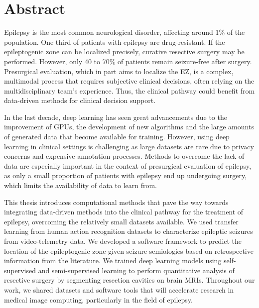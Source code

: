 \chapter{Abstract}


Epilepsy is the most common neurological disorder, affecting around 1\% of the population.
One third of patients with epilepsy are drug-resistant.
If the epileptogenic zone can be localized precisely, curative resective surgery may be performed.
However, only 40 to 70\% of patients remain seizure-free after surgery.
Presurgical evaluation, which in part aims to localize the \ac{EZ}, is a complex, multimodal process that requires subjective clinical decisions, often relying on the multidisciplinary team's experience.
Thus, the clinical pathway could benefit from data-driven methods for clinical decision support.

In the last decade, deep learning has seen great advancements due to the improvement of \acp{GPU}, the development of new algorithms and the large amounts of generated data that become available for training.
However, using deep learning in clinical settings is challenging as large datasets are rare due to privacy concerns and expensive annotation processes.
Methods to overcome the lack of data are especially important in the context of presurgical evaluation of epilepsy, as only a small proportion of patients with epilepsy end up undergoing surgery, which limits the availability of data to learn from.

This thesis introduces computational methods that pave the way towards integrating data-driven methods into the clinical pathway for the treatment of epilepsy, overcoming the relatively small datasets available.
We used transfer learning from human action recognition datasets to characterize epileptic seizures from video-telemetry data.
We developed a software framework to predict the location of the epileptogenic zone given seizure semiologies based on retrospective information from the literature.
We trained deep learning models using self-supervised and semi-supervised learning to perform quantitative analysis of resective surgery by segmenting resection cavities on brain \acp{MRI}.
Throughout our work, we shared datasets and software tools that will accelerate research in medical image computing, particularly in the field of epilepsy.
